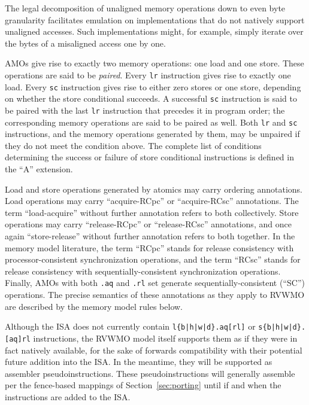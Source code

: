 \begin{commentary}
  The legal decomposition of unaligned memory operations down to even byte granularity facilitates emulation on implementations that do not natively support unaligned accesses.
  Such implementations might, for example, simply iterate over the bytes of a misaligned access one by one.
\end{commentary}

AMOs give rise to exactly two memory operations: one load and one store.  These operations are said to be {\em paired}.
Every {\tt lr} instruction gives rise to exactly one load.
Every {\tt sc} instruction gives rise to either zero stores or one store, depending on whether the store conditional succeeds.
A successful {\tt sc} instruction is said to be paired with the last {\tt lr} instruction that precedes it in program order; the corresponding memory operations are said to be paired as well.
Both {\tt lr} and {\tt sc} instructions, and the memory operations generated by them, may be unpaired if they do not meet the condition above.
The complete list of conditions determining the success or failure of store conditional instructions is defined in the ``A'' extension.

Load and store operations generated by atomics may carry ordering annotations.
Load operations may carry ``acquire-RCpc'' or ``acquire-RCsc'' annotations.
The term ``load-acquire'' without further annotation refers to both collectively.
Store operations may carry ``release-RCpc'' or ``release-RCsc'' annotations, and once again ``store-release'' without further annotation refers to both together.
In the memory model literature, the term ``RCpc'' stands for release consistency with processor-consistent synchronization operations, and the term ``RCsc'' stands for release consistency with sequentially-consistent synchronization operations.
Finally, AMOs with both {\tt .aq} and {\tt .rl} set generate sequentially-consistent (``SC'') operations.
The precise semantics of these annotations as they apply to RVWMO are described by the memory model rules below.

\begin{commentary}
  Although the ISA does not currently contain {\tt l\{b|h|w|d\}.aq[rl]} or {\tt s\{b|h|w|d\}.[aq]rl} instructions, the RVWMO model itself supports them as if they were in fact natively available, for the sake of forwards compatibility with their potential future addition into the ISA.  In the meantime, they will be supported as assembler pseudoinstructions.  These pseudoinstructions will generally assemble per the fence-based mappings of Section~\ref{sec:porting} until if and when the instructions are added to the ISA.
\end{commentary}

